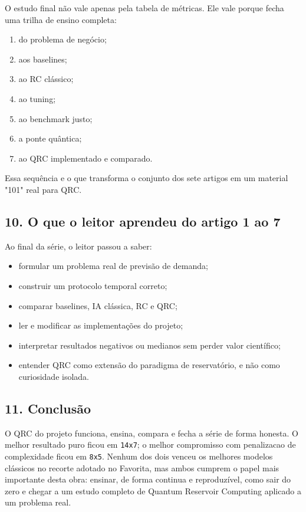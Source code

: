 \documentclass[12pt]{article}
\providecommand{\tightlist}{%
          \setlength{\itemsep}{0pt}\setlength{\parskip}{0pt}}
\begin{document}
O estudo final não vale apenas pela tabela de métricas. Ele vale porque fecha uma trilha de ensino completa:

\begin{enumerate}
\def\labelenumi{\arabic{enumi}.}
\tightlist
\item
  do problema de negócio;
\item
  aos baselines;
\item
  ao RC clássico;
\item
  ao tuning;
\item
  ao benchmark justo;
\item
  a ponte quântica;
\item
  ao QRC implementado e comparado.
\end{enumerate}

Essa sequência e o que transforma o conjunto dos sete artigos em um material "101" real para QRC.

\subsection{10. O que o leitor aprendeu do artigo 1 ao 7}\label{10-o-que-o-leitor-aprendeu-do-artigo-1-ao-7}

Ao final da série, o leitor passou a saber:

\begin{itemize}
\tightlist
\item
  formular um problema real de previsão de demanda;
\item
  construir um protocolo temporal correto;
\item
  comparar baselines, IA clássica, RC e QRC;
\item
  ler e modificar as implementações do projeto;
\item
  interpretar resultados negativos ou medianos sem perder valor científico;
\item
  entender QRC como extensão do paradigma de reservatório, e não como curiosidade isolada.
\end{itemize}

\subsection{11. Conclusão}\label{11-conclusuxe3o}

O QRC do projeto funciona, ensina, compara e fecha a série de forma honesta. O melhor resultado puro ficou em \texttt{14x7}; o melhor compromisso com penalizacao de complexidade ficou em \texttt{8x5}. Nenhum dos dois venceu os melhores modelos clássicos no recorte adotado no Favorita, mas ambos cumprem o papel mais importante desta obra: ensinar, de forma continua e reproduzível, como sair do zero e chegar a um estudo completo de Quantum Reservoir Computing aplicado a um problema real.
\end{document}
